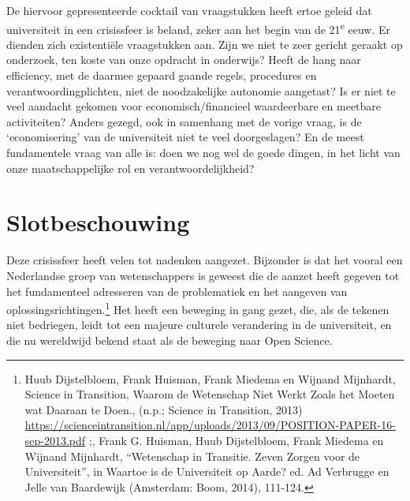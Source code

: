 \documentclass{jote-book}
\begin{document}
	De hiervoor gepresenteerde cocktail van vraagstukken heeft ertoe geleid dat universiteit in een crisissfeer is beland, zeker aan het begin van de 21\textsuperscript{e} eeuw. Er dienden zich existentiële vraagstukken aan. Zijn we niet te zeer gericht geraakt op onderzoek, ten koste van onze opdracht in onderwijs? Heeft de hang naar efficiency, met de daarmee gepaard gaande regels, procedures en verantwoordingplichten, niet de noodzakelijke autonomie aangetast? Is er niet te veel aandacht gekomen voor economisch/financieel waardeerbare en meetbare activiteiten? Anders gezegd, ook in samenhang met de vorige vraag, is de ‘economisering' van de universiteit niet te veel doorgeslagen? En de meest fundamentele vraag van alle is: doen we nog wel de goede dingen, in het licht van onze maatschappelijke rol en verantwoordelijkheid?



	\section{Slotbeschouwing }



	Deze crisissfeer heeft velen tot nadenken aangezet. Bijzonder is dat het vooral een Nederlandse groep van wetenschappers is geweest die de aanzet heeft gegeven tot het fundamenteel adresseren van de problematiek en het aangeven van oplossingsrichtingen.\footnote{Huub Dijstelbloem, Frank Huisman, Frank Miedema en Wijnand Mijnhardt, Science in Transition, Waarom de Wetenschap Niet Werkt Zoals het Moeten wat Daaraan te Doen., (n.p.; Science in Transition, 2013) \href{https://scienceintransition.nl/app/uploads/2013/09/POSITION-PAPER-16-sep-2013.pdf}{https://scienceintransition.nl/app/uploads/2013/09/POSITION-PAPER-16-sep-2013.pdf} ;, Frank G. Huisman, Huub Dijstelbloem, Frank Miedema en Wijnand Mijnhardt, “Wetenschap in Transitie. Zeven Zorgen voor de Universiteit”, in Waartoe is de Universiteit op Aarde? ed. Ad Verbrugge en Jelle van Baardewijk (Amsterdam: Boom, 2014), 111-124.} Het heeft een beweging in gang gezet, die, als de tekenen niet bedriegen, leidt tot een majeure culturele verandering in de universiteit, en die nu wereldwijd bekend staat als de beweging naar Open Science.
\end{document}
